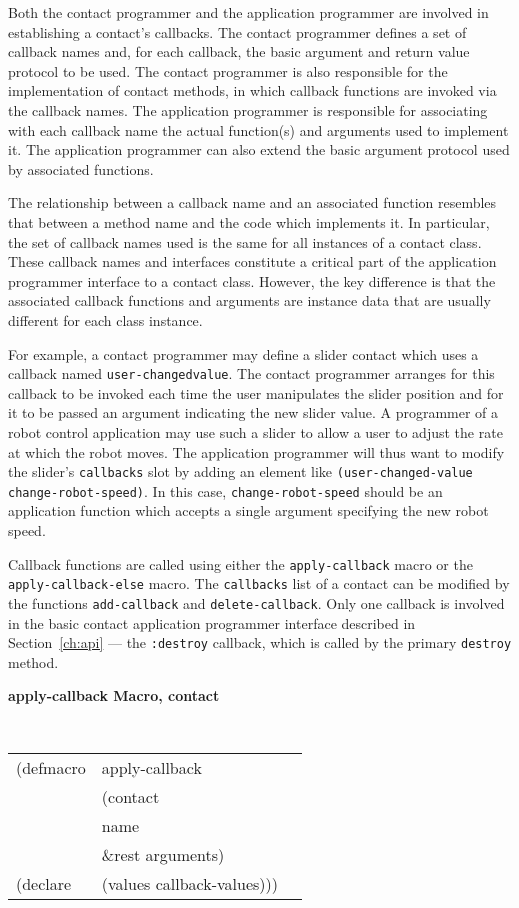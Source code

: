 Both the contact programmer and the application programmer are involved in
establishing a contact's callbacks.  The contact programmer defines a set of
callback names and, for each callback, the basic argument and return value
protocol to be used.  The contact programmer is also responsible for the
implementation of contact methods, in which callback functions are invoked via
the callback names.  The application programmer is responsible for associating
with each callback name the actual function(s) and arguments used to implement
it. The application programmer can also extend the basic argument protocol used
by associated functions.

The relationship between a callback name and an associated function resembles
that between a method name and the code which implements it.  In particular, the
set of callback names used is the same for all instances of a contact class.
These callback names and interfaces constitute a critical part of the
application programmer interface to a contact class.
However, the key difference is that the associated callback functions and
arguments are instance data that are usually different for each class instance.

For example, a contact programmer may define a slider contact which uses a
callback named {\tt user-changed\-value}.  The contact programmer arranges for
this callback to be invoked each time the user manipulates the slider position
and for it to be passed an argument indicating the new slider value.  A
programmer of a robot control application may use such a slider to
allow a user to adjust the rate at which the robot moves.  The application
programmer will thus want to modify the slider's {\tt callbacks} slot by adding
an element like {\tt (user-changed-value change-robot-speed)}. In this case,
{\tt change-robot-speed} should be an application function which accepts a
single argument specifying the new robot speed.

Callback functions are called using either the {\tt apply-callback}
macro or the {\tt apply-callback-else} macro.  The {\tt callbacks} list
of a contact can be modified by the functions {\tt add-callback} and
{\tt delete-callback}.  Only one callback is involved in the basic
contact application programmer interface described in
Section~\ref{ch:api} --- the {\tt :destroy} callback, which is called by
the primary {\tt destroy} method.

{\samepage
{\large {\bf apply-callback \hfill Macro, contact}} 

\begin{flushright} \parbox[t]{6.125in}{
\tt
\begin{tabular}{lll}
\raggedright
(defmacro & apply-callback & \\ 
& (contact\\
&  name\\
& \&rest arguments)\\
(declare &(values callback-values)))
\end{tabular}
\rm

}\end{flushright}
}

